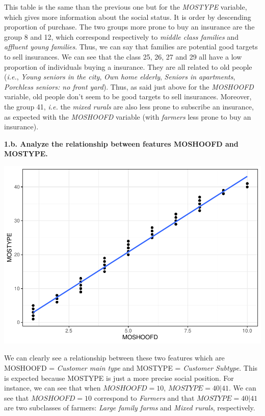 \documentclass[
  12pt,
  oneside]{report}
\begin{document}
This table is the same than the previous one but for the \emph{MOSTYPE} variable, which gives more information about the social status. It is order by descending proportion of purchase. The two groups more prone to buy an insurance are the group 8 and 12, which correspond respectively to \emph{middle class families} and \emph{affluent young families}. Thus, we can say that families are potential good targets to sell insurances. We can see that the class 25, 26, 27 and 29 all have a low proportion of individuals buying a insurance. They are all related to old people (\emph{i.e.}, \emph{Young seniors in the city}, \emph{Own home elderly}, \emph{Seniors in apartments}, \emph{Porchless seniors: no front yard}). Thus, as said just above for the \emph{MOSHOOFD} variable, old people don't seem to be good targets to sell insurances. Moreover, the group 41, \emph{i.e.} the \emph{mixed rurals} are also less prone to subscribe an insurance, as expected with the \emph{MOSHOOFD} variable (with \emph{farmers} less prone to buy an insurance).

\textbf{1.b. Analyze the relationship between features MOSHOOFD and MOSTYPE.}

\includegraphics{leroy_francois_hw2_files/figure-latex/unnamed-chunk-9-1.pdf}

We can clearly see a relationship between these two features which are MOSHOOFD = \emph{Customer main type} and MOSTYPE = \emph{Customer Subtype}. This is expected because MOSTYPE is just a more precise social position. For instance, we can see that when \(MOSHOOFD = 10\), \(MOSTYPE = 40 | 41\). We can see that \(MOSHOOFD = 10\) correspond to \emph{Farmers} and that \(MOSTYPE = 40 | 41\) are two subclasses of farmers: \emph{Large family farms} and \emph{Mixed rurals}, respectively.
\end{document}
